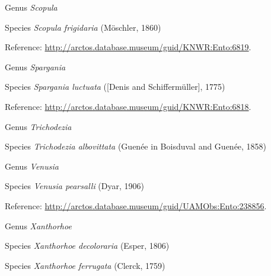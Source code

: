 \documentclass[9pt, article]{memoir}
\begin{document}
\begin{multicols}{2}
\vspace{6pt}\noindent\hspace{30pt}Genus \textit{Scopula}


\vspace{6pt}\noindent\hspace{36pt}Species \textit{Scopula frigidaria} (Möschler, 1860)


\vspace{6pt}Reference: 
\url{http://arctos.database.museum/guid/KNWR:Ento:6819}.

\vspace{6pt}\noindent\hspace{30pt}Genus \textit{Spargania}


\vspace{6pt}\noindent\hspace{36pt}Species \textit{Spargania luctuata} ([Denis and Schiffermüller], 1775)


\vspace{6pt}Reference: 
\url{http://arctos.database.museum/guid/KNWR:Ento:6818}.

\vspace{6pt}\noindent\hspace{30pt}Genus \textit{Trichodezia}


\vspace{6pt}\noindent\hspace{36pt}Species \textit{Trichodezia albovittata} (Guenée in Boisduval and Guenée, 1858)


\vspace{6pt}\noindent\hspace{30pt}Genus \textit{Venusia}


\vspace{6pt}\noindent\hspace{36pt}Species \textit{Venusia pearsalli} (Dyar, 1906)


\vspace{6pt}Reference: 
\url{http://arctos.database.museum/guid/UAMObs:Ento:238856}.

\vspace{6pt}\noindent\hspace{30pt}Genus \textit{Xanthorhoe}


\vspace{6pt}\noindent\hspace{36pt}Species \textit{Xanthorhoe decoloraria} (Esper, 1806)


\vspace{6pt}\noindent\hspace{36pt}Species \textit{Xanthorhoe ferrugata} (Clerck, 1759)



\end{multicols}
\end{document}
